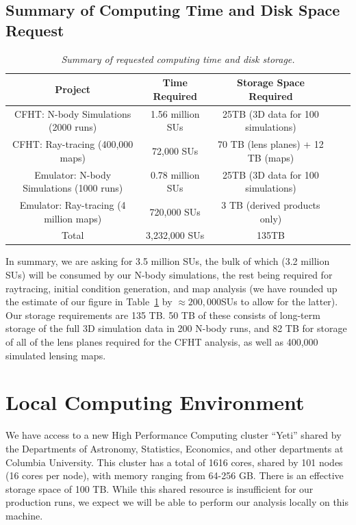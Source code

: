 \documentclass[10pt, preprint]{aastex}
\begin{document}
\subsection{Summary of Computing Time and Disk Space Request}

\begin{table}[t!] \label{tab:summary}
\begin{center}
\begin{tabular}{|c|c|c|c|c|}
\hline
\textbf{Project} & \textbf{Time Required} & \textbf{Storage Space Required}\\ \hline \hline\hline
CFHT: N-body Simulations (2000 runs) & 1.56 million SUs & 25TB (3D data for 100 simulations) \\ \hline 
CFHT: Ray-tracing (400,000 maps)  & 72,000 SUs & 70 TB (lens planes) + 12 TB (maps)\\ \hline
Emulator: N-body Simulations (1000 runs) & 0.78 million SUs & 25TB (3D data for 100 simulations) \\ \hline 
Emulator: Ray-tracing (4 million maps)  & 720,000 SUs & 3 TB (derived products only)\\ \hline\hline\hline
Total & 3,232,000 SUs & 135TB \\ \hline
\end{tabular}
\end{center}
\caption{\textit{Summary of requested computing time and disk storage.}}
\end{table}

In summary, we are asking for 3.5 million SUs, the bulk of which (3.2
million SUs) will be consumed by our N-body simulations, the rest
being required for raytracing, initial condition generation, and map
analysis (we have rounded up the estimate of our figure in
Table~\ref{tab:summary} by $\approx 200,000$SUs to allow for the
latter).  Our storage requirements are 135 TB.  50 TB of these
consists of long-term storage of the full 3D simulation data in 200
N-body runs, and 82 TB for storage of all of the lens planes required
for the CFHT analysis, as well as 400,000 simulated lensing maps.

\section{Local Computing Environment}\label{Local Computing}

We have access to a new High Performance Computing cluster ``Yeti''
shared by the Departments of Astronomy, Statistics, Economics, and
other departments at Columbia University.  This cluster has a total of
1616 cores, shared by 101 nodes (16 cores per node), with memory
ranging from 64-256 GB.  There is an effective storage space of 100
TB.  While this shared resource is insufficient for our production
runs, we expect we will be able to perform our analysis locally on
this machine.
\end{document}
